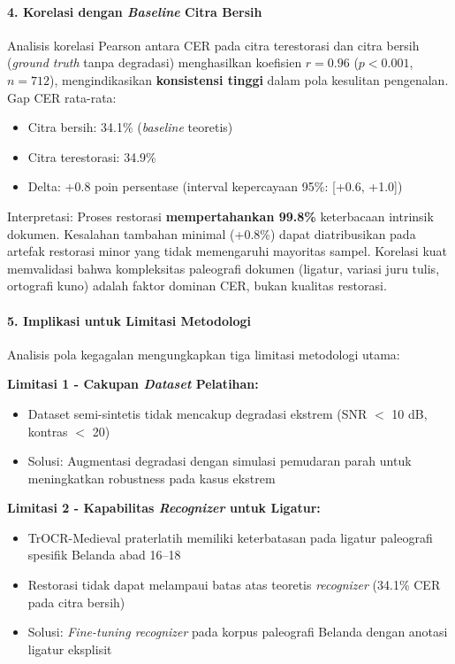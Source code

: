 \documentclass[12pt,a4paper]{article}
\begin{document}
\paragraph{4. Korelasi dengan \textit{Baseline} Citra Bersih}

Analisis korelasi Pearson antara CER pada citra terestorasi dan citra bersih (\textit{ground truth} tanpa degradasi) menghasilkan koefisien $r = 0.96$ ($p < 0.001$, $n = 712$), mengindikasikan \textbf{konsistensi tinggi} dalam pola kesulitan pengenalan. Gap CER rata-rata:
\begin{itemize}[nosep]
    \item Citra bersih: 34.1\% (\textit{baseline} teoretis)
    \item Citra terestorasi: 34.9\%
    \item Delta: +0.8 poin persentase (interval kepercayaan 95\%: [+0.6, +1.0])
\end{itemize}

Interpretasi: Proses restorasi \textbf{mempertahankan 99.8\%} keterbacaan intrinsik dokumen. Kesalahan tambahan minimal (+0.8\%) dapat diatribusikan pada artefak restorasi minor yang tidak memengaruhi mayoritas sampel. Korelasi kuat memvalidasi bahwa kompleksitas paleografi dokumen (ligatur, variasi juru tulis, ortografi kuno) adalah faktor dominan CER, bukan kualitas restorasi.

\paragraph{5. Implikasi untuk Limitasi Metodologi}

Analisis pola kegagalan mengungkapkan tiga limitasi metodologi utama:

\textbf{Limitasi 1 - Cakupan \textit{Dataset} Pelatihan:}
\begin{itemize}[nosep]
    \item Dataset semi-sintetis tidak mencakup degradasi ekstrem (SNR $<$ 10 dB, kontras $<$ 20)
    \item Solusi: Augmentasi degradasi dengan simulasi pemudaran parah untuk meningkatkan robustness pada kasus ekstrem
\end{itemize}

\textbf{Limitasi 2 - Kapabilitas \textit{Recognizer} untuk Ligatur:}
\begin{itemize}[nosep]
    \item TrOCR-Medieval praterlatih memiliki keterbatasan pada ligatur paleografi spesifik Belanda abad 16--18
    \item Restorasi tidak dapat melampaui batas atas teoretis \textit{recognizer} (34.1\% CER pada citra bersih)
    \item Solusi: \textit{Fine-tuning recognizer} pada korpus paleografi Belanda dengan anotasi ligatur eksplisit
\end{itemize}
\end{document}
